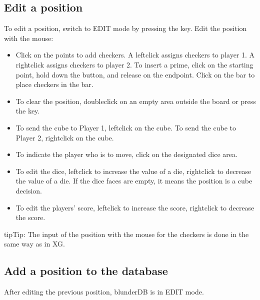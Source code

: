\documentclass[letterpaper,10pt,english]{sphinxmanual}
\begin{document}
\subsection{Edit a position}
\label{\detokenize{guide_utilisateur:editer-une-position}}\label{\detokenize{guide_utilisateur:guide-edit-position}}
\sphinxAtStartPar
To edit a position, switch to EDIT mode by pressing the  key. Edit the position with the mouse:
\begin{itemize}
\item {} 
\sphinxAtStartPar
Click on the points to add checkers. A left\sphinxhyphen{}click assigns checkers to player 1. A right\sphinxhyphen{}click assigns checkers to player 2. To insert a prime, click on the starting point, hold down the button, and release on the endpoint. Click on the bar to place checkers in the bar.

\item {} 
\sphinxAtStartPar
To clear the position, double\sphinxhyphen{}click on an empty area outside the board or press the  key.

\item {} 
\sphinxAtStartPar
To send the cube to Player 1, left\sphinxhyphen{}click on the cube. To send the cube to Player 2, right\sphinxhyphen{}click on the cube.

\item {} 
\sphinxAtStartPar
To indicate the player who is to move, click on the designated dice area.

\item {} 
\sphinxAtStartPar
To edit the dice, left\sphinxhyphen{}click to increase the value of a die, right\sphinxhyphen{}click to decrease the value of a die. If the dice faces are empty, it means the position is a cube decision.

\item {} 
\sphinxAtStartPar
To edit the players’ score, left\sphinxhyphen{}click to increase the score, right\sphinxhyphen{}click to decrease the score.

\end{itemize}

\begin{sphinxadmonition}{tip}{Tip:}
\sphinxAtStartPar
The input of the position with the mouse for the checkers is done in the same way as in XG.
\end{sphinxadmonition}


\subsection{Add a position to the database}
\label{\detokenize{guide_utilisateur:ajouter-une-position-a-la-base-de-donnees}}
\sphinxAtStartPar
After editing the previous position, blunderDB is in EDIT mode.
\end{document}
